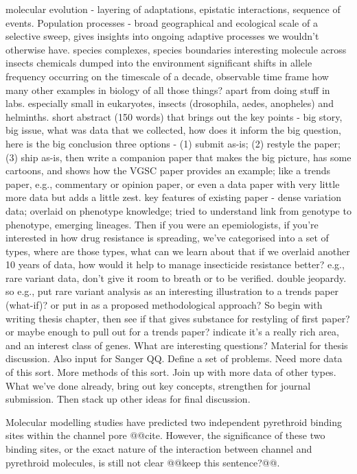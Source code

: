 molecular evolution - layering of adaptations, epistatic interactions, sequence of events.
%
Population processes - broad geographical and ecological scale of a selective sweep, gives insights into ongoing adaptive processes we wouldn't otherwise have.
%
species complexes, species boundaries
%
interesting molecule across insects
%
chemicals dumped into the environment
%
significant shifts in allele frequency occurring on the timescale of a decade, observable time frame
%
how many other examples in biology of all those things? apart from doing stuff in labs.
%
especially small in eukaryotes, insects (drosophila, aedes, anopheles) and helminths.
%
short abstract (150 words) that brings out the key points - big story, big issue, what was data that we collected, how does it inform the big question, here is the big conclusion
%
three options - (1) submit as-is; (2) restyle the paper; (3) ship as-is, then write a companion paper that makes the big picture, has some cartoons, and shows how the VGSC paper provides an example; like a trends paper, e.g., commentary or opinion paper, or even a data paper with very little more data but adds a little zest.
%
key features of existing paper - dense variation data; overlaid on phenotype knowledge; tried to understand link from genotype to phenotype, emerging lineages. Then if you were an epemiologists, if you're interested in how drug resistance is spreading, we've categorised into a set of types, where are those types, what can we learn about that if we overlaid another 10 years of data, how would it help to manage insecticide resistance better?
%
e.g., rare variant data, don't give it room to breath or to be verified. double jeopardy. so e.g., put rare variant analysis as an interesting illustration to a trends paper (what-if)? or put in as a proposed methodological approach?
%
So begin with writing thesis chapter, then see if that gives substance for restyling of first paper? or maybe enough to pull out for a trends paper? indicate it's a really rich area, and an interest class of genes.
%
What are interesting questions? Material for thesis discussion. Also input for Sanger QQ. Define a set of problems. Need more data of this sort. More methods of this sort. Join up with more data of other types.
%
What we've done already, bring out key concepts, strengthen for journal submission. Then stack up other ideas for final discussion.


Molecular modelling studies have predicted two independent pyrethroid binding sites within the channel pore @@cite.
%
However, the significance of these two binding sites, or the exact nature of the interaction between channel and pyrethroid molecules, is still not clear @@keep this sentence?@@.


